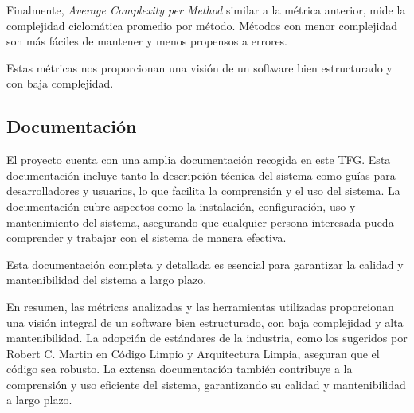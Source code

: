 Finalmente, \textit{Average Complexity per Method} similar a la métrica anterior, mide la complejidad ciclomática
promedio por método.
Métodos con menor complejidad son más fáciles de mantener y menos propensos a errores.

Estas métricas nos proporcionan una visión de un software bien estructurado y con baja complejidad.

\subsection*{Documentación}

El proyecto cuenta con una amplia documentación recogida en este TFG.
Esta documentación incluye tanto la descripción técnica del sistema como guías para desarrolladores y usuarios, lo que
facilita la comprensión y el uso del sistema.
La documentación cubre aspectos como la instalación, configuración, uso y mantenimiento del sistema, asegurando que
cualquier persona interesada pueda comprender y trabajar con el sistema de manera efectiva.

Esta documentación completa y detallada es esencial para garantizar la calidad y mantenibilidad del sistema a largo
plazo.

En resumen, las métricas analizadas y las herramientas utilizadas proporcionan una visión integral de un software bien
estructurado, con baja complejidad y alta mantenibilidad.
La adopción de estándares de la industria, como los sugeridos por Robert C. Martin en Código Limpio y Arquitectura
Limpia, aseguran que el código sea robusto.
La extensa documentación también contribuye a la comprensión y uso eficiente del sistema, garantizando su calidad y
mantenibilidad a largo plazo.












